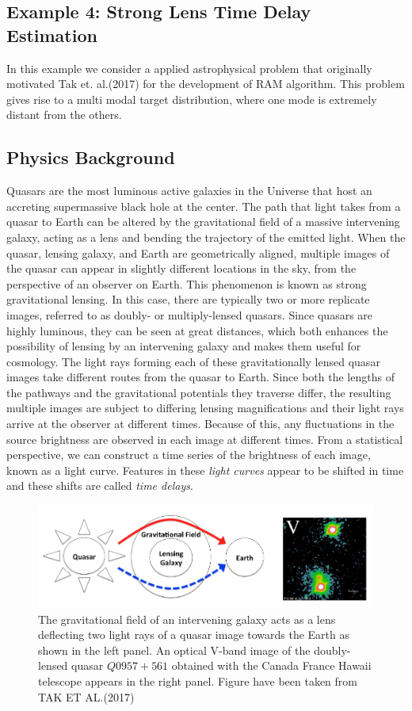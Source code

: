 \documentclass{article}
\begin{document}
\subsection{Example 4: Strong Lens Time Delay Estimation
}
In this example we consider a applied astrophysical
problem that originally motivated Tak et. al.(2017) for the development of RAM algorithm. This problem gives rise to a multi modal target distribution, where one mode is extremely distant from the others. 
\subsection*{Physics Background}
Quasars are the most luminous active galaxies in the
Universe that host an accreting supermassive black hole at the center. The
path that light takes from a quasar to Earth can be altered by the gravitational field of a massive intervening galaxy, acting as a lens and bending
the trajectory of the emitted light. When the
quasar, lensing galaxy, and Earth are geometrically aligned, multiple images
of the quasar can appear in slightly different locations in the sky, from the
perspective of an observer on Earth. This phenomenon is known as strong
gravitational lensing. In this case, there are typically two or more
replicate images, referred to as doubly- or multiply-lensed quasars. Since
quasars are highly luminous, they can be seen at great distances, which
both enhances the possibility of lensing by an intervening galaxy and makes
them useful for cosmology.
The light rays forming each of these gravitationally lensed quasar images
take different routes from the quasar to Earth. Since both the lengths of the
pathways and the gravitational potentials they traverse differ, the resulting
multiple images are subject to differing lensing magnifications and their light
rays arrive at the observer at different times. Because of this, any fluctuations
in the source brightness are observed in each image at different times. From
a statistical perspective, we can construct a time series of the brightness of
each image, known as a light curve. Features in these \textit{light curves} appear to
be shifted in time and these shifts are called \textit{time delays}.
\begin{figure}[ht]
    \centering
    \includegraphics[width=\textwidth]{Screenshot from 2021-05-13 06-49-57.png}
    \caption{The gravitational field of an intervening galaxy acts as a lens deflecting two light
rays of a quasar image towards the Earth as shown in the left panel. An optical V-band image of the doubly-lensed quasar $Q0957+561$ obtained with the Canada France Hawaii telescope appears in the right panel. Figure have been taken from TAK ET AL.(2017)}
    \label{fig:my_label}
\end{figure}
\end{document}
